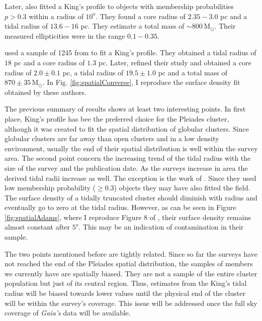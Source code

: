 Later, \citet{Adams2001} also fitted a King's profile to objects with membership probabilities $p>0.3$ within a radius of $10^o$. They found a core radius of $2.35-3.0$ pc and a tidal radius of $13.6-16$ pc. They estimate a total mass of $\sim 800\,\mathrm{M_{\odot}}$. Their measured ellipticities were in the range $0.1-0.35$. 

\citet{Converse2008} used a sample of 1245 from \citet{Stauffer2007} to fit a King's profile. They obtained a tidal radius of $18$ pc and a core radius of  $1.3$ pc. Later, \citet{Converse2010} refined their study and obtained a core radius of $2.0\pm0.1$ pc, a tidal radius of $19.5 \pm 1.0 $ pc and a total mass of $870\pm35\,\mathrm{M_{\odot}}$. In Fig. \ref{fig:spatialConverse}, I reproduce the surface density fit obtained by these authors.

The previous summary of results shows at least two interesting points. In first place, King's profile \citep{King1962} has bee the preferred choice for the Pleiades cluster, although it was created to fit the spatial distribution of globular clusters. Since globular clusters are far away than open clusters and in a low density environment, usually the end of their spatial distribution is well within the survey area. The second point concern the increasing trend of the tidal radius with the size of the survey and the publication date. As the surveys increase in area the derived tidal radii increase as well. The exception is the work of \citet{Adams2001}. Since they used low membership probability ($\geq0.3$) objects they may have also fitted the field. The surface density of a tidally truncated cluster should diminish with radius and eventually go to zero at the tidal radius. However, as can be seen in Figure \ref{fig:spatialAdams}, where I reproduce Figure 8 of \citet{Adams2001}, their surface density remains almost constant after $5^o$. This may be an indication of contamination in their sample.

The two points mentioned before are tightly related. Since so far the surveys have not reached the end of the Pleiades spatial distribution, the samples of members we currently have are spatially biased. They are not a sample of the entire cluster population but just of its central region. Thus, estimates from the King's tidal radius will be biased towards lower values until the physical end of the cluster will be within the survey's coverage. This issue will be addressed once the full sky coverage of \emph{Gaia's} data will be available.


